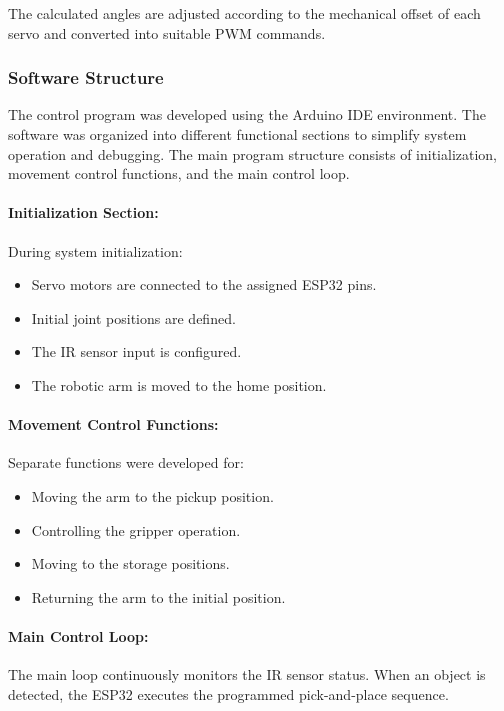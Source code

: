 The calculated angles are adjusted according to the mechanical offset of each servo and converted into suitable PWM commands.

\subsubsection{Software Structure}

The control program was developed using the Arduino IDE environment. The software was organized into different functional sections to simplify system operation and debugging. The main program structure consists of initialization, movement control functions, and the main control loop.

\paragraph{Initialization Section:}
During system initialization:

\begin{itemize}
    \item Servo motors are connected to the assigned ESP32 pins.
    \item Initial joint positions are defined.
    \item The IR sensor input is configured.
    \item The robotic arm is moved to the home position.
\end{itemize}

\paragraph{Movement Control Functions:}
Separate functions were developed for:

\begin{itemize}
    \item Moving the arm to the pickup position.
    \item Controlling the gripper operation.
    \item Moving to the storage positions.
    \item Returning the arm to the initial position.
\end{itemize}

\paragraph{Main Control Loop:}
The main loop continuously monitors the IR sensor status. When an object is detected, the ESP32 executes the programmed pick-and-place sequence.


